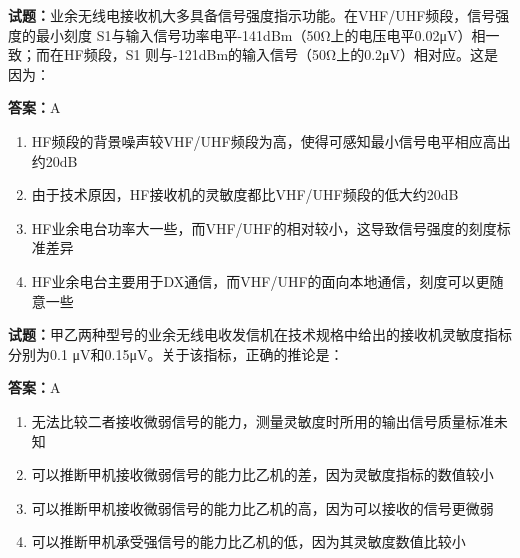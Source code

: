 \documentclass{ctexbook}
\begin{document}
\vspace{1em}

\textbf{试题：}业余无线电接收机大多具备信号强度指示功能。在VHF/UHF频段，信号强度的最小刻度
S1与输入信号功率电平-141dBm（50Ω上的电压电平0.02μV）相一致；而在HF频段，S1
则与-121dBm的输入信号（50Ω上的0.2μV）相对应。这是因为： 

\textbf{答案：}A 

\begin{enumerate}[leftmargin=3em]
  \item HF频段的背景噪声较VHF/UHF频段为高，使得可感知最小信号电平相应高出约20dB 

  \item 由于技术原因，HF接收机的灵敏度都比VHF/UHF频段的低大约20dB 

  \item HF业余电台功率大一些，而VHF/UHF的相对较小，这导致信号强度的刻度标准差异 

  \item HF业余电台主要用于DX通信，而VHF/UHF的面向本地通信，刻度可以更随意一些 

\end{enumerate}





\vspace{1em}

\textbf{试题：}甲乙两种型号的业余无线电收发信机在技术规格中给出的接收机灵敏度指标分别为0.1
μV和0.15μV。关于该指标，正确的推论是： 

\textbf{答案：}A 

\begin{enumerate}[leftmargin=3em]
  \item 无法比较二者接收微弱信号的能力，测量灵敏度时所用的输出信号质量标准未知 

  \item 可以推断甲机接收微弱信号的能力比乙机的差，因为灵敏度指标的数值较小 

  \item 可以推断甲机接收微弱信号的能力比乙机的高，因为可以接收的信号更微弱 

  \item 可以推断甲机承受强信号的能力比乙机的低，因为其灵敏度数值比较小 

\end{enumerate}


\end{document}
